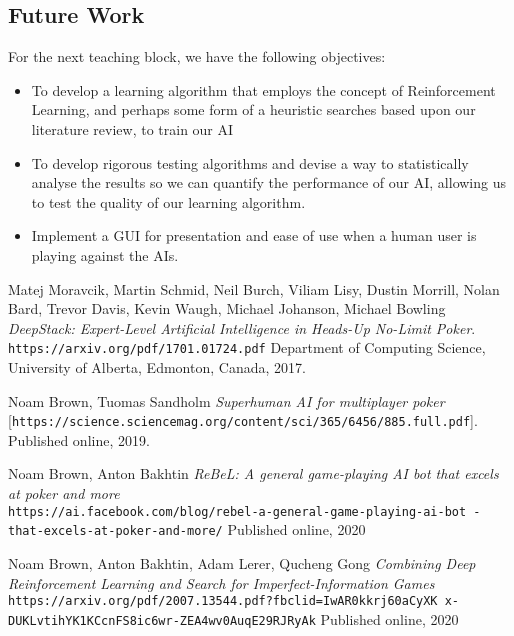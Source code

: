 \documentclass{article}
\begin{document}
\begin{multicols*}{2}
\section{Future Work}
For the next teaching block, we have the following objectives:
\begin{itemize}
    \item To develop a learning algorithm that employs the concept of Reinforcement Learning, and perhaps some form of a heuristic searches based upon our literature review, to train our AI
    \item To develop rigorous testing algorithms and devise a way to statistically analyse the results so we can quantify the performance of our AI, allowing us to test the quality of our learning algorithm.
    \item Implement a GUI for presentation and ease of use when a human user is playing against the AIs.
\end{itemize}





\end{multicols*}









\begin{thebibliography}{9}
Matej Moravcik, Martin Schmid, Neil Burch, Viliam Lisy, Dustin Morrill, Nolan Bard, Trevor Davis, Kevin Waugh, Michael Johanson, Michael Bowling
\textit{DeepStack: Expert-Level Artificial Intelligence in
Heads-Up No-Limit Poker}.
\texttt{https://arxiv.org/pdf/1701.01724.pdf}
Department of Computing Science, University of Alberta, Edmonton, Canada, 2017.

Noam Brown, Tuomas Sandholm
\textit{Superhuman AI for multiplayer poker}
[\texttt{https://science.sciencemag.org/content/sci/365/6456/885.full.pdf}].
Published online, 2019.

Noam Brown, Anton Bakhtin
\textit{ReBeL: A general game-playing AI bot that excels at poker and more}
\\\texttt{https://ai.facebook.com/blog/rebel-a-general-game-playing-ai-bot
-that-excels-at-poker-and-more/}
Published online, 2020

Noam Brown, Anton Bakhtin, Adam Lerer, Qucheng Gong
\textit{Combining Deep Reinforcement Learning and Search
for Imperfect-Information Games}
\\\texttt{https://arxiv.org/pdf/2007.13544.pdf?fbclid=IwAR0kkrj60aCyXK
x-DUKLvtihYK1KCcnFS8ic6wr-ZEA4wv0AuqE29RJRyAk}
Published online, 2020





\end{thebibliography}
\end{document}

